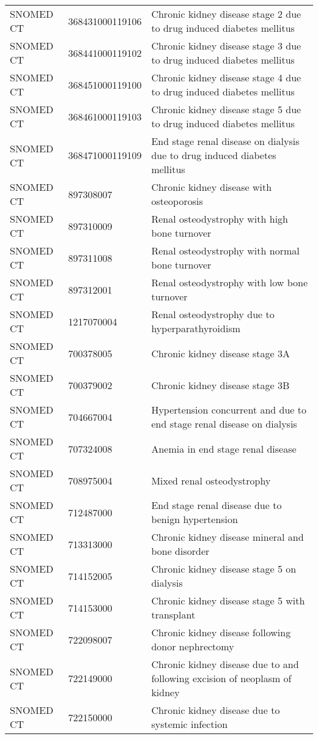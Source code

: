 \begin{longtable}{p{}p{}p{}}
  SNOMED CT & 368431000119106 & Chronic kidney disease stage 2 due to drug induced diabetes mellitus \\ 
  SNOMED CT & 368441000119102 & Chronic kidney disease stage 3 due to drug induced diabetes mellitus \\ 
  SNOMED CT & 368451000119100 & Chronic kidney disease stage 4 due to drug induced diabetes mellitus \\ 
  SNOMED CT & 368461000119103 & Chronic kidney disease stage 5 due to drug induced diabetes mellitus \\ 
  SNOMED CT & 368471000119109 & End stage renal disease on dialysis due to drug induced diabetes mellitus \\ 
  SNOMED CT & 897308007 & Chronic kidney disease with osteoporosis \\ 
  SNOMED CT & 897310009 & Renal osteodystrophy with high bone turnover \\ 
  SNOMED CT & 897311008 & Renal osteodystrophy with normal bone turnover \\ 
  SNOMED CT & 897312001 & Renal osteodystrophy with low bone turnover \\ 
  SNOMED CT & 1217070004 & Renal osteodystrophy due to hyperparathyroidism \\ 
  SNOMED CT & 700378005 & Chronic kidney disease stage 3A \\ 
  SNOMED CT & 700379002 & Chronic kidney disease stage 3B \\ 
  SNOMED CT & 704667004 & Hypertension concurrent and due to end stage renal disease on dialysis \\ 
  SNOMED CT & 707324008 & Anemia in end stage renal disease \\ 
  SNOMED CT & 708975004 & Mixed renal osteodystrophy \\ 
  SNOMED CT & 712487000 & End stage renal disease due to benign hypertension \\ 
  SNOMED CT & 713313000 & Chronic kidney disease mineral and bone disorder \\ 
  SNOMED CT & 714152005 & Chronic kidney disease stage 5 on dialysis \\ 
  SNOMED CT & 714153000 & Chronic kidney disease stage 5 with transplant \\ 
  SNOMED CT & 722098007 & Chronic kidney disease following donor nephrectomy \\ 
  SNOMED CT & 722149000 & Chronic kidney disease due to and following excision of neoplasm of kidney \\ 
  SNOMED CT & 722150000 & Chronic kidney disease due to systemic infection \\ 

\end{longtable}
